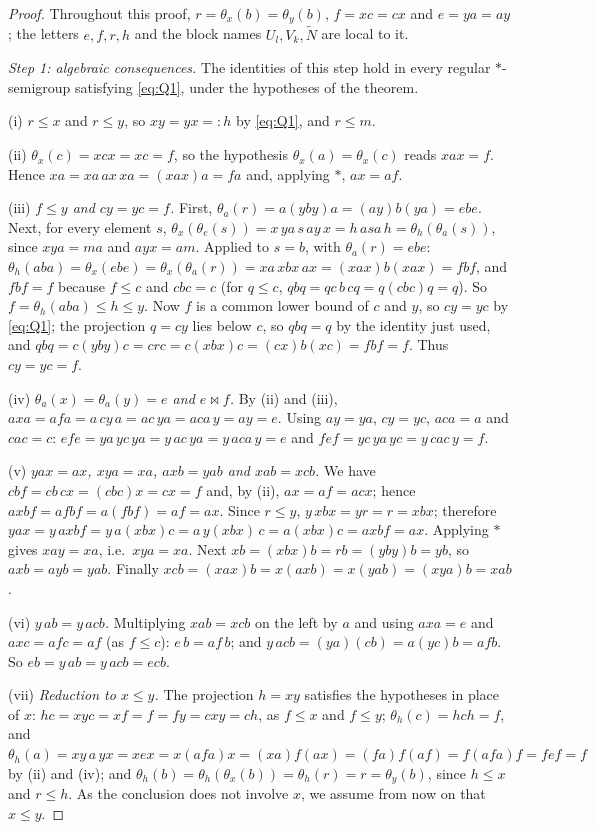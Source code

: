 \documentclass[11pt]{amsart}
\theoremstyle{definition}
\newcommand{\mt}{\bowtie}      %
\begin{document}
\begin{proof}
Throughout this proof, $r=\theta_x(b)=\theta_y(b)$, $f=xc=cx$ and $e=ya=ay$; the letters $e,f,r,h$ and the block names $U_l,V_k,\tilde N$ are local to it.

\smallskip
\emph{Step 1: algebraic consequences.} The identities of this step hold in every regular $*$-semigroup satisfying \eqref{eq:Q1}, under the hypotheses of the theorem.

(i) $r\le x$ and $r\le y$, so $xy=yx=:h$ by \eqref{eq:Q1}, and $r\le m$.

(ii) $\theta_x(c)=xcx=xc=f$, so the hypothesis $\theta_x(a)=\theta_x(c)$ reads $xax=f$. Hence $xa=xa\,ax\,xa=(xax)a=fa$ and, applying $*$, $ax=af$.

(iii) \emph{$f\le y$ and $cy=yc=f$.} First, $\theta_a(r)=a(yby)a=(ay)b(ya)=ebe$. Next, for every element $s$, $\theta_x(\theta_e(s))=x\,ya\,s\,ay\,x=h\,asa\,h=\theta_h(\theta_a(s))$, since $xya=ma$ and $ayx=am$. Applied to $s=b$, with $\theta_a(r)=ebe$: $\theta_h(aba)=\theta_x(ebe)=\theta_x(\theta_a(r))=xa\,xbx\,ax=(xax)b(xax)=fbf$, and $fbf=f$ because $f\le c$ and $cbc=c$ (for $q\le c$, $qbq=qc\,b\,cq=q(cbc)q=q$). So $f=\theta_h(aba)\le h\le y$. Now $f$ is a common lower bound of $c$ and $y$, so $cy=yc$ by \eqref{eq:Q1}; the projection $q=cy$ lies below $c$, so $qbq=q$ by the identity just used, and $qbq=c(yby)c=crc=c(xbx)c=(cx)b(xc)=fbf=f$. Thus $cy=yc=f$.

(iv) \emph{$\theta_a(x)=\theta_a(y)=e$ and $e\mt f$.} By (ii) and (iii), $axa=afa=a\,cy\,a=ac\,ya=aca\,y=ay=e$. Using $ay=ya$, $cy=yc$, $aca=a$ and $cac=c$: $efe=ya\,yc\,ya=y\,ac\,ya=y\,aca\,y=e$ and $fef=yc\,ya\,yc=y\,cac\,y=f$.

(v) \emph{$yax=ax$, $xya=xa$, $axb=yab$ and $xab=xcb$.} We have $cbf=cb\,cx=(cbc)x=cx=f$ and, by (ii), $ax=af=acx$; hence $axbf=afbf=a(fbf)=af=ax$. Since $r\le y$, $y\,xbx=yr=r=xbx$; therefore $yax=y\,axbf=y\,a(xbx)c=a\,y(xbx)\,c=a(xbx)c=axbf=ax$. Applying $*$ gives $xay=xa$, i.e.\ $xya=xa$. Next $xb=(xbx)b=rb=(yby)b=yb$, so $axb=ayb=yab$. Finally $xcb=(xax)b=x(axb)=x(yab)=(xya)b=xab$.

(vi) \emph{$y\,ab=y\,acb$.} Multiplying $xab=xcb$ on the left by $a$ and using $axa=e$ and $axc=afc=af$ (as $f\le c$): $e\,b=af\,b$; and $y\,acb=(ya)(cb)=a(yc)b=afb$. So $eb=y\,ab=y\,acb=ecb$.

(vii) \emph{Reduction to $x\le y$.} The projection $h=xy$ satisfies the hypotheses in place of $x$: $hc=xyc=xf=f=fy=cxy=ch$, as $f\le x$ and $f\le y$; $\theta_h(c)=hch=f$, and $\theta_h(a)=xy\,a\,yx=xex=x(afa)x=(xa)f(ax)=(fa)f(af)=f(afa)f=fef=f$ by (ii) and (iv); and $\theta_h(b)=\theta_h(\theta_x(b))=\theta_h(r)=r=\theta_y(b)$, since $h\le x$ and $r\le h$. As the conclusion does not involve $x$, we assume from now on that $x\le y$.


\end{proof}
\end{document}
